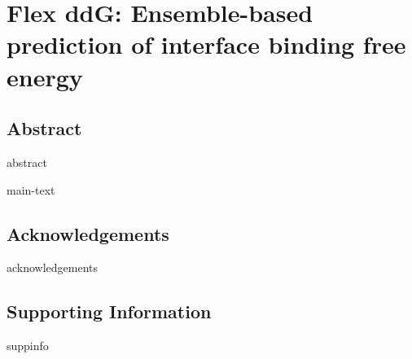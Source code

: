 \chapter{Flex ddG: Ensemble-based prediction of interface binding free energy}
\label{chapter:web-benchmark}

\section{Abstract}
{abstract}

{main-text}

\section{Acknowledgements}
{acknowledgements}

\section{Supporting Information}
{suppinfo}
